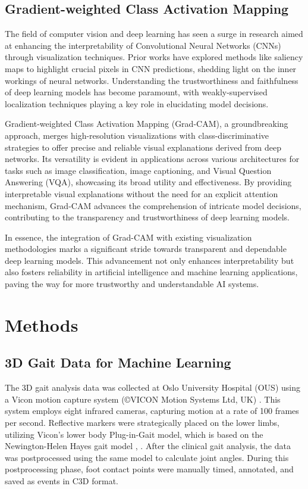 \documentclass[UKenglish]{uiomasterthesis}
\begin{document}
\subsection{Gradient-weighted Class Activation Mapping}
The field of computer vision and deep learning has seen a surge in research aimed at enhancing the interpretability of Convolutional Neural Networks (CNNs) through visualization techniques. Prior works have explored methods like saliency maps to highlight crucial pixels in CNN predictions, shedding light on the inner workings of neural networks. Understanding the trustworthiness and faithfulness of deep learning models has become paramount, with weakly-supervised localization techniques playing a key role in elucidating model decisions.

Gradient-weighted Class Activation Mapping (Grad-CAM), a groundbreaking approach, merges high-resolution visualizations with class-discriminative strategies to offer precise and reliable visual explanations derived from deep networks. Its versatility is evident in applications across various architectures for tasks such as image classification, image captioning, and Visual Question Answering (VQA), showcasing its broad utility and effectiveness. By providing interpretable visual explanations without the need for an explicit attention mechanism, Grad-CAM advances the comprehension of intricate model decisions, contributing to the transparency and trustworthiness of deep learning models.

In essence, the integration of Grad-CAM with existing visualization methodologies marks a significant stride towards transparent and dependable deep learning models. This advancement not only enhances interpretability but also fosters reliability in artificial intelligence and machine learning applications, paving the way for more trustworthy and understandable AI systems.

\section{Methods}

\subsection{3D Gait Data for Machine Learning}
The 3D gait analysis data was collected at Oslo University Hospital (OUS) using a Vicon motion capture system (©VICON Motion Systems Ltd, UK) \cite{noauthor_vicon_nodate}. This system employs eight infrared cameras, capturing motion at a rate of 100 frames per second. Reflective markers were strategically placed on the lower limbs, utilizing Vicon’s lower body Plug-in-Gait model, which is based on the Newington-Helen Hayes gait model \cite{kadaba_measurement_nodate}, \cite{davis_iii_gait_nodate}. After the clinical gait analysis, the data was postprocessed using the same model to calculate joint angles. During this postprocessing phase, foot contact points were manually timed, annotated, and saved as events in C3D format.
\end{document}
